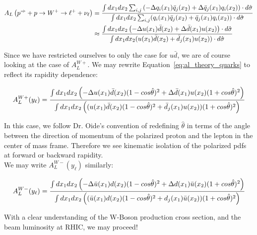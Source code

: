 \begin{align}\label{eq:al_theory_quarks}
  {
    A_L
    \left(
      p^{\Rightarrow}+p\rightarrow W^+ \rightarrow \ell^+ +\nu_{\ell}
    \right)
  } &=  
  {
    {
      \int dx_1 dx_2 \sum_{i,j}
      \left(
        -\Delta q_i(x_1)\bar{q}_j(x_2)
        +\Delta \bar{q}_j(x_1)q_i(x_2)
      \right)\cdot d \hat{\sigma}
    }
    \over
    {
      \int dx_1 dx_2
      \sum_{i,j}(q_i(x_1)\bar{q}_j(x_2)+\bar{q}_j(x_1)q_i(x_2))\cdot d\hat{\sigma}
    }
 }\\
 & \approx  \nonumber
 {
   {
      \int dx_1 dx_2 
      \left(
        -\Delta u(x_1)\bar{d}(x_2)
        +\Delta \bar{d}(x_1)u(x_2)
      \right)\cdot d \hat{\sigma}
   }
   \over
   {
      \int dx_1 dx_2 (u(x_1)\bar{d}(x_2)+\bar{d}_j(x_1)u(x_2))\cdot d\hat{\sigma}
   }
 }
\end{align}

Since we have restricted ourselves to only the case for $u\bar{d}$, we are of
course looking at the case of $A_L^{W+}$. We may rewrite
Equation~\ref{eq:al_theory_quarks} to reflect its rapidity dependence:

\begin{equation}
  {A_L^{W+}(y_{\ell})} = 
  {
    {
     \int dx_1 dx_2 
     \left(
       -\Delta u(x_1)\bar{d}(x_2)(1-cos\hat{\theta})^2
       +\Delta \bar{d}(x_1)u(x_2)(1+cos\hat{\theta})^2
     \right)
    }
    \over
    {
       \int dx_1 dx_2 
       \left(
       (u(x_1)\bar{d}(x_2)   (1-cos\hat{\theta})^2
      +\bar{d}_j(x_1)u(x_2)) (1+cos\hat{\theta})^2
        \right)
    }
  }
  \label{eq:al_w_pos_rapidity_dependance}
\end{equation}

In this case, we follow Dr. Oide's convention of redefining $\hat{\theta}$ in
terms of the angle between the direction of momentum of the polarized proton and
the lepton in the center of mass frame. Therefore we see kinematic isolation of
the polarized pdfs at forward or backward rapidity.\\

{\noindent}We may write $A_L^{W-}(y_{\ell})$ similarly:

\begin{equation}
  {A_L^{W-}(y_{\ell})} = 
  {
    {
     \int dx_1 dx_2 
     \left(
       -\Delta \bar{u}(x_1)d(x_2)(1-cos\hat{\theta})^2
       +\Delta d(x_1)\bar{u}(x_2)(1+cos\hat{\theta})^2
     \right)
    }
    \over
    {
       \int dx_1 dx_2 
       \left(
         (\bar{u}(x_1)d(x_2)   (1-cos\hat{\theta})^2
         +d_j(x_1)\bar{u}(x_2)) (1+cos\hat{\theta})^2
        \right)
    }
  }
  \label{eq:al_w_neg_rapidity_dependance}
\end{equation}
\clearpage

With a clear understanding of the W-Boson production cross section, and the beam
luminosity at RHIC, we may proceed!
